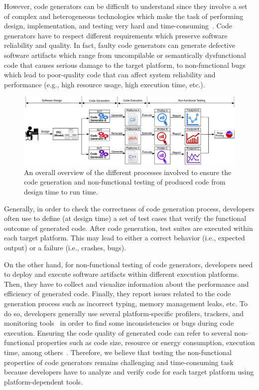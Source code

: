 However, code generators can be difficult to understand since they involve a set of complex and heterogeneous technologies which make the task of performing design, implementation, and testing very hard and time-consuming~\cite{france2007model,guana2015developers}. Code generators have to respect different requirements which preserve software reliability and quality. In fact, faulty code generators can generate defective software artifacts which range from uncompilable or semantically dysfunctional code that causes serious damage to the target platform, to non-functional bugs which lead to poor-quality code that can affect system reliability and performance (e.g., high resource usage, high execution time, etc.). 
\begin{figure}[h]
	\includegraphics[width=1\linewidth]{Ressources/background.pdf}
	\caption{An overall overview of the different processes involved to ensure the code generation and non-functional testing of produced code from design time to run time.}
\end{figure}

Generally, in order to check the correctness of code generation process, developers often use to define (at design time) a set of test cases that verify the functional outcome of generated code. After code generation, test suites are executed within each target platform. This may lead to either a correct behavior (i.e., expected output) or a failure (i.e., crashes, bugs). 

On the other hand, for non-functional testing of code generators, developers need to deploy and execute software artifacts within different execution platforms. Then, they have to collect and visualize information about the performance and efficiency of generated code. Finally, they report issues related to the code generation process such as incorrect typing, memory management leaks, etc. To do so, developers generally use several platform-specific profilers, trackers, and monitoring tools~\cite{guana2014chaintracker,delgado2004taxonomy} in order to find some inconsistencies or bugs during code execution. Ensuring the code quality of generated code can refer to several non-functional properties such as code size, resource or energy consumption, execution time, among others~\cite{pan2006fast}. Therefore, we believe that testing the non-functional properties of code generators remains challenging and time-consuming task because developers have to analyze and verify code for each target platform using platform-dependent tools.

